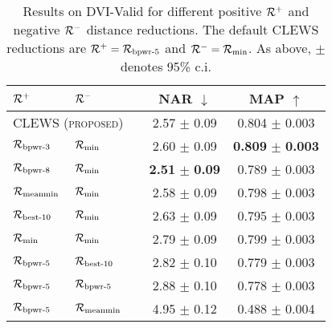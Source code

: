 \begin{table}[t]
\caption{Results on DVI-Valid for different positive $\mathcal{R}^+$ and negative $\mathcal{R}^-$ distance reductions. The default CLEWS reductions are $\mathcal{R}^+=\mathcal{R}_{\text{bpwr-5}}$ and $\mathcal{R}^-=\mathcal{R}_{\text{min}}$. As above, $\pm$ denotes 95\% c.i. %
}
\label{tab:redux}
\tablecaptionspace
\begin{center}
\begin{small}
\begin{tabular}{lllcc}
\toprule
$\mathcal{R}^+$             & $\mathcal{R}^-$           & & \textsc{NAR} $\downarrow$ & \textsc{MAP} $\uparrow$ \\
\midrule
\multicolumn{2}{l}{\textsc{CLEWS (proposed)}} & & 2.57 $\pm$ 0.09 & 0.804 $\pm$ 0.003 \\
$\mathcal{R}_{\text{bpwr-3}}$   & $\mathcal{R}_{\text{min}}$    & & 2.60 $\pm$ 0.09 & \textbf{0.809} $\pm$ \textbf{0.003} \\
$\mathcal{R}_{\text{bpwr-8}}$   & $\mathcal{R}_{\text{min}}$    & & \textbf{2.51} $\pm$ \textbf{0.09} & 0.789 $\pm$ 0.003 \\
$\mathcal{R}_{\text{meanmin}}$  & $\mathcal{R}_{\text{min}}$    & & 2.58 $\pm$ 0.09 & 0.798 $\pm$ 0.003 \\
$\mathcal{R}_{\text{best-10}}$  & $\mathcal{R}_{\text{min}}$    & & 2.63 $\pm$ 0.09 & 0.795 $\pm$ 0.003 \\
$\mathcal{R}_{\text{min}}$      & $\mathcal{R}_{\text{min}}$    & & 2.79 $\pm$ 0.09 & 0.799 $\pm$ 0.003 \\
$\mathcal{R}_{\text{bpwr-5}}$   & $\mathcal{R}_{\text{best-10}}$ & & 2.82 $\pm$ 0.10 & 0.779 $\pm$ 0.003 \\
$\mathcal{R}_{\text{bpwr-5}}$   & $\mathcal{R}_{\text{bpwr-5}}$ & & 2.88 $\pm$ 0.10 & 0.778 $\pm$ 0.003 \\
$\mathcal{R}_{\text{bpwr-5}}$   & $\mathcal{R}_{\text{meanmin}}$ & & 4.95 $\pm$ 0.12 & 0.488 $\pm$ 0.004 \\
\bottomrule
\end{tabular}
\end{small}
\end{center}
\vskip -0.1in
\end{table}
